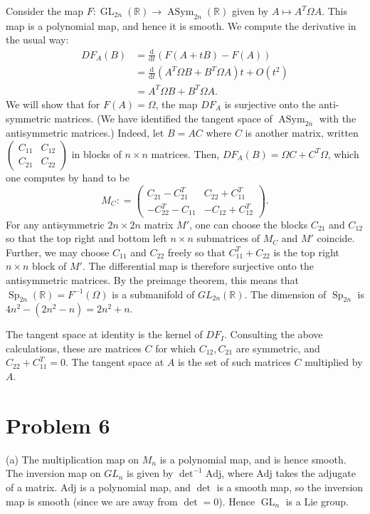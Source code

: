\documentclass{amsart}
\numberwithin{equation}{section}
\theoremstyle{plain}
\theoremstyle{definition}
\theoremstyle{remark}
\renewcommand{\_}[2]{\underbrace{#1}_{#2}}
\renewcommand{\^}[2]{\overbrace{#1}_{#2}}
\newcommand{\R}{\mathbb{R}}
\newcommand{\GL}{\operatorname{GL}}
\newcommand{\Sp}{\operatorname{Sp}}
\newcommand{\ASym}{\operatorname{ASym}}
\renewcommand{\d}{\mathrm{d}}
\begin{document}
Consider the map $F: \GL_{2n}(\R) \to \ASym_{2n}(\R)$ given by $A \mapsto A^T\Omega A$. This map is a polynomial map, and hence it is smooth. We compute the derivative in the usual way:
\begin{align*}
  DF_A(B) &= \frac{\d}{\d t} \left( F(A+tB) - F(A) \right) \\
          &= \frac{\d}{\d t} \left( A^T \Omega B + B^T \Omega A \right) t + O(t^2) \\
          &= A^T \Omega B + B^T \Omega A.
\end{align*}
We will show that for $F(A) = \Omega$, the map $DF_A$ is surjective onto the anti-symmetric matrices. (We have identified the tangent space of $\ASym_{2n}$ with the antisymmetric matrices.) Indeed, let $B = AC$ where $C$ is another matrix, written $
\begin{pmatrix}
  C_{11} & C_{12}\\
  C_{21} & C_{22}
\end{pmatrix}$ in blocks of $n\times n$ matrices. Then, $DF_A(B) = \Omega C + C^T \Omega$, which one computes by hand to be $$M_C: = 
\begin{pmatrix}
  C_{21} - C_{21}^T & C_{22} + C_{11}^T \\
  -C_{22}^T - C_{11} & -C_{12} + C_{12}^T
\end{pmatrix}.$$For any antisymmetric $2n\times 2n$ matrix $M'$, one can choose the blocks $C_{21}$ and $C_{12}$ so that the top right and bottom left $n\times n$ submatrices of $M_C$ and $M'$ coincide. Further, we may choose $C_{11}$ and $C_{22}$ freely so that $C_{11}^T + C_{22}$ is the top right $n\times n$ block of $M'$. The differential map is therefore surjective onto the antisymmetric matrices. By the preimage theorem, this means that $\Sp_{2n}(\R) = F^{-1}(\Omega)$ is a submanifold of $GL_{2n}(\R)$. The dimension of $\Sp_{2n}$ is $4n^2 - (2n^2 - n) = 2n^2 + n$.

The tangent space at identity is the kernel of $DF_I$. Consulting the above calculations, these are matrices $C$ for which $C_{12}, C_{21}$ are symmetric, and $C_{22} + C_{11}^T = 0$. The tangent space at $A$ is the set of such matrices $C$ multiplied by $A$.

\section*{Problem 6}
(a) The multiplication map on $M_n$ is a polynomial map, and is hence smooth. The inversion map on $GL_n$ is given by $\det ^{-1} \mathrm{Adj}$, where $\mathrm{Adj}$ takes the adjugate of a matrix. $\mathrm{Adj}$ is a polynomial map, and $\det$ is a smooth map, so the inversion map is smooth (since we are away from $\det = 0$). Hence $\GL_n$ is a Lie group.
\end{document}
